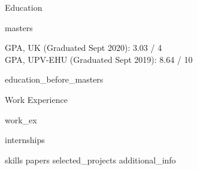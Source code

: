 \documentclass{resume}
\begin{document}


\begin{rSection}{\faGraduationCap \hspace{0.5mm} Education}

    {masters}
            
            GPA, UK (Graduated Sept 2020): 3.03 / 4\\
            GPA, UPV-EHU (Graduated Sept 2019): 8.64 / 10
    
    {education_before_masters}
    
\end{rSection}


\begin{rSection}{\faBriefcase \hspace{0.5mm} Work Experience}

    {work_ex}
            
    {internships}

\end{rSection}


{skills}
{papers}
{selected_projects}
{additional_info}

\end{document}
